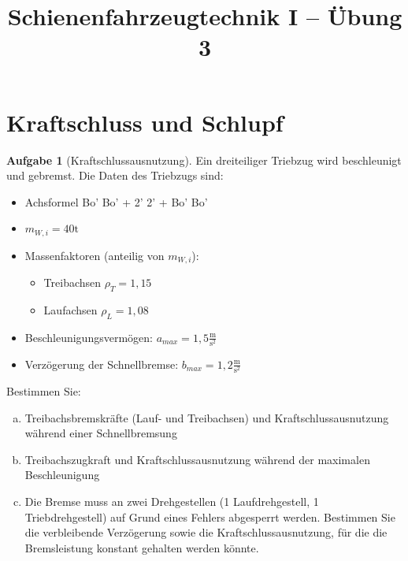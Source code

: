 \documentclass[10pt,a4paper,headsepline,smallheadings]{scrartcl}
\title{Schienenfahrzeugtechnik I  -- \"Ubung 3}
\date{}
\theoremstyle{definition}
\newtheorem{aufgabe}{Aufgabe}
\begin{document}
\thispagestyle{empty}
\maketitle
\vspace{-2cm}

\section*{Kraftschluss und Schlupf}
\begin{aufgabe}[Kraftschlussausnutzung]
Ein dreiteiliger Triebzug wird beschleunigt und gebremst. Die Daten des Triebzugs sind:
\begin{itemize}
	\item Achsformel Bo' Bo' + 2' 2' + Bo' Bo'
	\item $m_{W,i} = 40 \mathrm{t}$
	\item Massenfaktoren (anteilig von $m_{W,i}$):
	\begin{itemize}
		\item Treibachsen $\rho_{T} = 1{,}15$
		\item Laufachsen $\rho_{L} = 1{,}08$
	\end{itemize} 
	\item Beschleunigungsverm\"ogen: $a_{max} = 1{,}5 \frac{\mathrm{m}}{\mathrm{s}^2}$
	\item Verz\"ogerung der Schnellbremse: $b_{max} = 1{,}2 \frac{\mathrm{m}}{\mathrm{s}^2}$
\end{itemize} 

Bestimmen Sie:
\begin{enumerate}[a)]
\item Treibachsbremskr\"afte (Lauf- und Treibachsen) und Kraftschlussausnutzung w\"ahrend einer Schnellbremsung
\item Treibachszugkraft und Kraftschlussausnutzung w\"ahrend der maximalen Beschleunigung
\item Die Bremse muss an zwei Drehgestellen (1 Laufdrehgestell, 1 Triebdrehgestell) auf Grund eines Fehlers abgesperrt werden. Bestimmen Sie die verbleibende Verz\"ogerung sowie die Kraftschlussausnutzung, f\"ur die die Bremsleistung konstant gehalten werden k\"onnte.
\end{enumerate}
\end{aufgabe}
\vspace{0.5cm}
\end{document}
